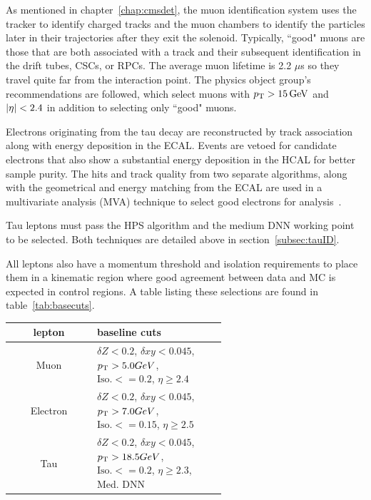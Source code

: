 As mentioned in chapter~\ref{chap:cmsdet}, the muon identification system uses the tracker to identify charged tracks and the muon chambers to identify the particles later in their trajectories after they exit the solenoid. Typically, ``good" muons are those that are both associated with a track and their subsequent identification in the drift tubes, CSCs, or RPCs. The average muon lifetime is 2.2 $\mu$s so they travel quite far from the interaction point.  The physics object group's recommendations are followed, which select muons with $p_{\mathrm{T}}>15\,\text{Ge\hspace{-.08em}V}$ and $\lvert \eta \rvert<2.4$ in addition to selecting only ``good" muons.

Electrons originating from the tau decay are reconstructed by track association along with energy deposition in the ECAL. Events are vetoed for candidate electrons that also show a substantial energy deposition in the HCAL for better sample purity. The hits and track quality from two separate algorithms, along with the geometrical and energy matching from the ECAL are used in a multivariate analysis (MVA) technique to select good electrons for analysis~\cite{Khachatryan:2015hwa}.

Tau leptons must pass the HPS algorithm and the medium DNN working point to be selected. Both techniques are detailed above in section~\ref{subsec:tauID}. 

All leptons also have a momentum threshold and isolation requirements to place them in a kinematic region where good agreement between data and MC is expected in control regions. A table listing these selections are found in table~\ref{tab:basecuts}.

\begin{table}[h!tbp]
\centering
{}
\begin{tabular*}{0.8\textwidth}{c|p{0.6\linewidth}}
\hline
lepton          & baseline cuts \\\hline 
Muon            & $\delta Z < 0.2$, $\delta xy < 0.045$, $p_{\mathrm{T}} > 5.0 GeV$, $\text{Iso.} <= 0.2$, $\eta \geq 2.4$\\\hline
Electron        & $\delta Z < 0.2$, $\delta xy < 0.045$, $p_{\mathrm{T}} > 7.0 GeV$, $\text{Iso.} <= 0.15$, $\eta \geq 2.5$ \\\hline
Tau             & $\delta Z < 0.2$, $\delta xy < 0.045$, $p_{\mathrm{T}} > 18.5 GeV$, $\text{Iso.} <= 0.2$, $\eta \geq 2.3$, Med. DNN \\\hline
\end{tabular*}
\end{table}


